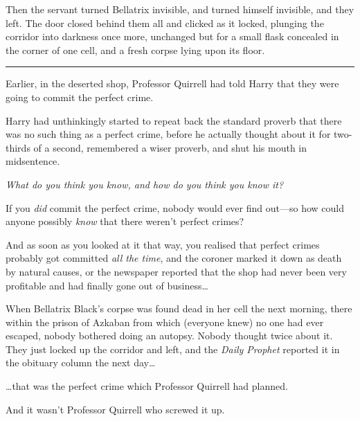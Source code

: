 Then the servant turned Bellatrix invisible, and turned himself
invisible, and they left. The door closed behind them all and clicked as
it locked, plunging the corridor into darkness once more, unchanged but
for a small flask concealed in the corner of one cell, and a fresh
corpse lying upon its floor.

\begin{center}\rule{3in}{0.4pt}\end{center}

Earlier, in the deserted shop, Professor Quirrell had told Harry that
they were going to commit the perfect crime.

Harry had unthinkingly started to repeat back the standard proverb that
there was no such thing as a perfect crime, before he actually thought
about it for two-thirds of a second, remembered a wiser proverb, and
shut his mouth in midsentence.

\emph{What do you think you know, and how do you think you know it?}

If you \emph{did} commit the perfect crime, nobody would ever find
out---so how could anyone possibly \emph{know} that there weren't
perfect crimes?

And as soon as you looked at it that way, you realised that perfect
crimes probably got committed \emph{all the time}, and the coroner
marked it down as death by natural causes, or the newspaper reported
that the shop had never been very profitable and had finally gone out of
business\ldots{}

When Bellatrix Black's corpse was found dead in her cell the next
morning, there within the prison of Azkaban from which (everyone knew)
no one had ever escaped, nobody bothered doing an autopsy. Nobody
thought twice about it. They just locked up the corridor and left, and
the \emph{Daily Prophet} reported it in the obituary column the next
day\ldots{}

\ldots{}that was the perfect crime which Professor Quirrell had planned.

And it wasn't Professor Quirrell who screwed it up.

